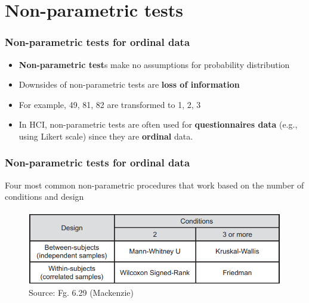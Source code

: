 \documentclass{beamer}
\begin{document}
\section{Non-parametric tests} %

\begin{frame}
	\frametitle{Non-parametric tests for ordinal data} 
	\begin{itemize}
		\item \textbf{Non-parametric test}s make no assumptions for probability distribution%
		\item Downsides of non-parametric tests are \textbf{loss of information} %
		\item For example, 49, 81, 82 are transformed to 1, 2, 3
		\item In HCI, non-parametric tests are often used for \textbf{questionnaires data} (e.g., using Likert scale) since they are \textbf{ordinal} data.  %
	\end{itemize}
\end{frame}

\begin{frame}
	\frametitle{Non-parametric tests for ordinal data} 
	Four most common non-parametric procedures that work based on the number of conditions and design %
	\begin{figure}
		\includegraphics[width=0.9\linewidth]{6-29}
		\caption{Source: Fg. 6.29 (Mackenzie)}
	\end{figure}
\end{frame}
\end{document}
